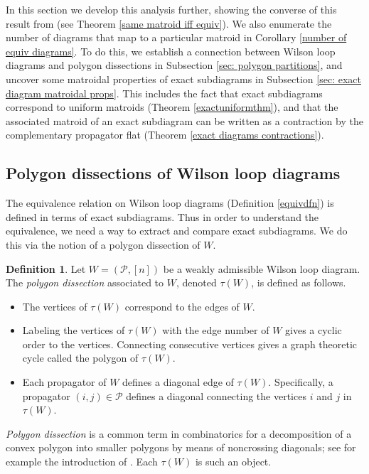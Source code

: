 \documentclass[11pt]{article}
\newcommand{\cP}{\mathcal{P}}
\theoremstyle{remark}
\theoremstyle{definition}
\newtheorem{dfn}[thm]{Definition}
\begin{document}
In this section we develop this analysis further, showing the converse of this result from \cite{wilsonloop} (see Theorem \ref{same matroid iff equiv}). We also enumerate the number of diagrams that map to a particular matroid in Corollary \ref{number of equiv diagrams}. To do this, we establish a connection between Wilson loop diagrams and polygon dissections in Subsection \ref{sec: polygon partitions}, and uncover some matroidal properties of exact subdiagrams in Subsection \ref{sec: exact diagram matroidal props}. This includes the fact that exact subdiagrams correspond to uniform matroids (Theorem \ref{exactuniformthm}), and that the associated matroid of an exact subdiagram can be written as a contraction by the complementary propagator flat (Theorem \ref{exact diagrams contractions}).


\subsection{Polygon dissections of Wilson loop diagrams\label{sec: polygon partitions}}


The equivalence relation on Wilson loop diagrams (Definition \ref{equivdfn}) is defined in terms of exact subdiagrams. Thus in order to understand the equivalence, we need a way to extract and compare exact subdiagrams. We do this via the notion of a polygon dissection of $W$.

\begin{dfn}\label{WLDtriangulationdfn}
  Let $W = (\cP, [n])$ be a weakly admissible Wilson loop diagram.  The \emph{polygon dissection} associated to $W$, denoted $\tau(W)$, is defined as follows.
  \begin{itemize}
  \item The vertices of $\tau(W)$ correspond to the edges of $W$.
  \item Labeling the vertices of $\tau(W)$ with the edge number of $W$ gives a cyclic order to the vertices. Connecting consecutive vertices gives a graph theoretic cycle called the polygon of $\tau(W)$.
  \item Each propagator of $W$ defines a diagonal edge of $\tau(W)$.  Specifically,  a propagator $(i,j) \in \cP$ defines a diagonal connecting the vertices $i$ and $j$ in $\tau(W)$.
  \end{itemize}
\end{dfn}

\emph{Polygon dissection} is a common term in combinatorics for a decomposition of a convex polygon into smaller polygons by means of noncrossing diagonals; see for example the introduction of {\cite{PSpolygon}}.  Each $\tau(W)$ is such an object.
\end{document}
